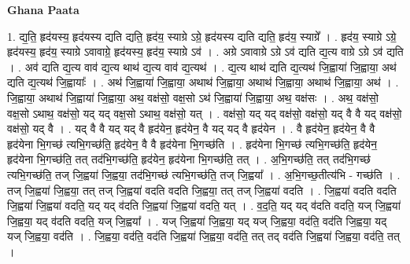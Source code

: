 \documentclass[17pt]{extarticle}
\begin{document}
\textbf{Ghana Paata } \newline

1. द्य॒ति॒ हृद॑यस्य॒ हृद॑यस्य द्यति द्यति॒ हृद॑य॒ स्याग्रे ऽग्रे॒ हृद॑यस्य द्यति द्यति॒ हृद॑य॒ स्याग्रे᳚ । . हृद॑य॒ स्याग्रे ऽग्रे॒ हृद॑यस्य॒ हृद॑य॒ स्याग्रे ऽवावाग्रे॒ हृद॑यस्य॒ हृद॑य॒ स्याग्रे ऽव॑ । . अग्रे ऽवावाग्रे ऽग्रे ऽव॑ द्यति द्य॒त्य वाग्रे ऽग्रे ऽव॑ द्यति । . अव॑ द्यति द्य॒त्य वाव॑ द्य॒त्य थाथ॑ द्य॒त्य वाव॑ द्य॒त्यथ॑ । . द्य॒त्य थाथ॑ द्यति द्य॒त्यथ॑ जि॒ह्वाया॑ जि॒ह्वाया॒ अथ॑ द्यति द्य॒त्यथ॑ जि॒ह्वायाः᳚ । . अथ॑ जि॒ह्वाया॑ जि॒ह्वाया॒ अथाथ॑ जि॒ह्वाया॒ अथाथ॑ जि॒ह्वाया॒ अथाथ॑ जि॒ह्वाया॒ अथ॑ । . जि॒ह्वाया॒ अथाथ॑ जि॒ह्वाया॑ जि॒ह्वाया॒ अथ॒ वक्ष॑सो॒ वक्ष॒सो ऽथ॑ जि॒ह्वाया॑ जि॒ह्वाया॒ अथ॒ वक्ष॑सः । . अथ॒ वक्ष॑सो॒ वक्ष॒सो ऽथाथ॒ वक्ष॑सो॒ यद् यद् वक्ष॒सो ऽथाथ॒ वक्ष॑सो॒ यत् । . वक्ष॑सो॒ यद् यद् वक्ष॑सो॒ वक्ष॑सो॒ यद् वै वै यद् वक्ष॑सो॒ वक्ष॑सो॒ यद् वै । . यद् वै वै यद् यद् वै हृद॑येन॒ हृद॑येन॒ वै यद् यद् वै हृद॑येन । . वै हृद॑येन॒ हृद॑येन॒ वै वै हृद॑येना भि॒गच्छ॑ त्यभि॒गच्छ॑ति॒ हृद॑येन॒ वै वै हृद॑येना भि॒गच्छ॑ति । . हृद॑येना भि॒गच्छ॑ त्यभि॒गच्छ॑ति॒ हृद॑येन॒ हृद॑येना भि॒गच्छ॑ति॒ तत् तद॑भि॒गच्छ॑ति॒ हृद॑येन॒ हृद॑येना भि॒गच्छ॑ति॒ तत् । . अ॒भि॒गच्छ॑ति॒ तत् तद॑भि॒गच्छ॑ त्यभि॒गच्छ॑ति॒ तज् जि॒ह्वया॑ जि॒ह्वया॒ तद॑भि॒गच्छ॑ त्यभि॒गच्छ॑ति॒ तज् जि॒ह्वया᳚ । . अ॒भि॒गच्छ॒तीत्य॑भि - गच्छ॑ति । . तज् जि॒ह्वया॑ जि॒ह्वया॒ तत् तज् जि॒ह्वया॑ वदति वदति जि॒ह्वया॒ तत् तज् जि॒ह्वया॑ वदति । . जि॒ह्वया॑ वदति वदति जि॒ह्वया॑ जि॒ह्वया॑ वदति॒ यद् यद् व॑दति जि॒ह्वया॑ जि॒ह्वया॑ वदति॒ यत् । . व॒द॒ति॒ यद् यद् व॑दति वदति॒ यज् जि॒ह्वया॑ जि॒ह्वया॒ यद् व॑दति वदति॒ यज् जि॒ह्वया᳚ । . यज् जि॒ह्वया॑ जि॒ह्वया॒ यद् यज् जि॒ह्वया॒ वद॑ति॒ वद॑ति जि॒ह्वया॒ यद् यज् जि॒ह्वया॒ वद॑ति । . जि॒ह्वया॒ वद॑ति॒ वद॑ति जि॒ह्वया॑ जि॒ह्वया॒ वद॑ति॒ तत् तद् वद॑ति जि॒ह्वया॑ जि॒ह्वया॒ वद॑ति॒ तत् । \newline
\end{document}
